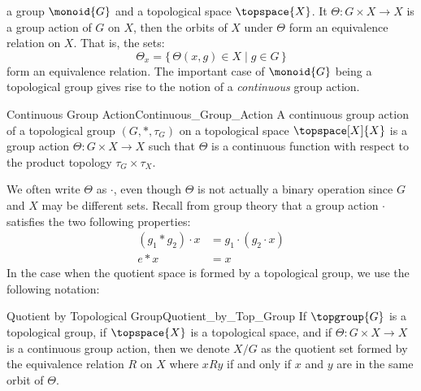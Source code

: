         a group $\monoid{G}$ and a topological space $\topspace{X}$. It
        $\Theta:G\times{X}\rightarrow{X}$ is a group action of $G$ on $X$, then
        the orbits of $X$ under $\Theta$ form an equivalence relation on $X$.
        That is, the sets:
        \begin{equation}
            \Theta_{x}=\{\,\Theta(x,g)\in{X}\;|\;g\in{G}\,\}
        \end{equation}
        form an equivalence relation. The important case of $\monoid{G}$ being a
        topological group gives rise to the notion of a \textit{continuous}
        group action.
        \begin{fdefinition}{Continuous Group Action}{Continuous_Group_Action}
            A continuous group action of a topological group $(G,*,\tau_{G})$ on
            a topological space $\topspace[X]{X}$ is a group action
            $\Theta:G\times{X}\rightarrow{X}$ such that $\Theta$ is
            a continuous function with respect to the product topology
            $\tau_{G}\times\tau_{X}$.
        \end{fdefinition}
        We often write $\Theta$ as $\cdot$, even though $\Theta$ is not actually
        a binary operation since $G$ and $X$ may be different sets. Recall from
        group theory that a group action $\cdot$ satisfies the two following
        properties:
        \begin{align}
            (g_{1}*{g}_{2})\cdot{x}&=g_{1}\cdot(g_{2}\cdot{x})\\
            e*x&=x
        \end{align}
        In the case when the quotient space is formed by a topological group, we
        use the following notation:
        \begin{fnotation}{Quotient by Topological Group}{Quotient_by_Top_Group}
            If $\topgroup{G}$ is a topological group, if $\topspace{X}$ is a
            topological space, and if $\Theta:G\times{X}\rightarrow{X}$ is a
            continuous group action, then we denote $X/G$ as the quotient set
            formed by the equivalence relation $R$ on $X$ where $xRy$ if and
            only if $x$ and $y$ are in the same orbit of $\Theta$.
        \end{fnotation}
